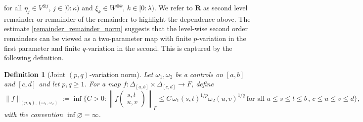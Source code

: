 \documentclass{article}%
\newtheorem{definition}[theorem]{Definition}
\begin{document}
for all $\eta_{j}\in V^{\otimes j}$, $j\in\lbrack0:\kappa)$ and  $\xi_{k}\in W^{\otimes k}$, $k\in\lbrack0:\lambda).$
We refer to $\mathbf{R}$ as second level remainder or remainder of the remainder to highlight the dependence above. The estimate \eqref{remainder_remainder_norm} suggests that the level-wise second order remainders can be viewed as a two-parameter map with finite $p$-variation in the first parameter and finite $q$-variation in the second. This is captured by the following definition.  
\begin{definition}[Joint $(p, q)$-variation norm]
Let $\omega_1, \omega_2$ be a controls on $[a,b]$ and $[c,d]$ and let $p,q \ge 1$. For a map $f : \Delta_{[a,b]} \times \Delta_{[c,d]} \to F$, define
\[
\|f\|_{(p,q),(\omega_1, \omega_2)} := \inf \Big\{ C > 0 : \left \|f{\begin{pmatrix}
    s, t \\ u,  v
\end{pmatrix}}\right\|_F \le C \, \omega_1(s,t)^{1/p} \omega_2(u,v)^{1/q} \ \text{for all } a \le s \le t \le b\, , \, c \le u \le v \le d  \Big\},
\]
with the convention $\inf\varnothing=\infty$.
\end{definition}
\end{document}
